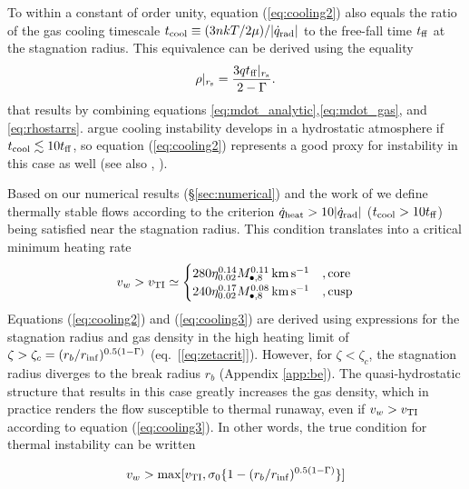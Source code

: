 \documentclass[usenatbib,fleqn]{mn2e}
\newcommand{\tff}{t_{\rm ff}}
\begin{document}
To within a constant of order unity, equation (\ref{eq:cooling2}) also
equals the ratio of the gas cooling timescale $t_{\rm cool} \equiv (3n
kT/2 \mu)/|\dot{q}_{\rm rad}|$ to the free-fall time $t_{\rm ff}$ at the
stagnation radius.  This equivalence can be derived using the equality
\begin{align}
\rho|_{r_{\rm s}}=\frac{3 q\tff|_{r_{\rm s}}}{2-\Gamma}.
\label{eq:rhors2}
\end{align}
that results by combining equations
\eqref{eq:mdot_analytic},\eqref{eq:mdot_gas}, and
\eqref{eq:rhostarrs}.  \citet{McCourt+12} argue cooling instability
develops in a hydrostatic atmosphere if $t_{\rm cool} \lesssim 10 t_{\rm ff}$,
so equation (\ref{eq:cooling2}) represents a good proxy for
instability in this case as well (see also \citealt{Li&Bryan14a}, \citealt{Li&Bryan14b}).

Based on our numerical results (\S \ref{sec:numerical}) and the work of \citet{McCourt+12} we define thermally stable flows according to the criterion $\dot{q}_{\rm heat} > 10|\dot{q}_{\rm rad}|$ ($t_{\rm
  cool} > 10t_{\rm ff}$) being satisfied near the stagnation radius.  This condition translates into a
critical minimum heating rate
\begin{align}
v_{w} > v_{\rm TI} \simeq
  \begin{cases}
   280 \eta_{0.02}^{0.14} M_{\bullet,8}^{0.11}\,{\rm km\,s^{-1}}  &, \text{core}\\
   240 \eta_{0.02}^{0.17} M_{\bullet,8}^{0.08}\,{\rm km\,s^{-1}}   &, \text{cusp}  \\
  \end{cases}
  \label{eq:cooling3}
\end{align}
Equations (\ref{eq:cooling2}) and (\ref{eq:cooling3}) are derived
using expressions for the stagnation radius and gas density in the
high heating limit of $\zeta > \zeta_c = (r_{b}/r_{\rm
  inf})^{0.5(1-\Gamma)}$ (eq.~[\ref{eq:zetacrit}]).  However, for
$\zeta < \zeta_c$, the stagnation radius diverges to the break radius
$r_b$ (Appendix \ref{app:be}).  The quasi-hydrostatic structure that
results in this case greatly increases the gas density, which in
practice renders the flow susceptible to thermal runaway, even if
$v_{w} > v_{\rm TI}$ according to equation (\ref{eq:cooling3}).  In
other words, the true condition for thermal instability  can be
written

\begin{equation}
v_w > {\rm max}[v_{\rm TI},\sigma_0\{1-(r_{b}/r_{\rm
  inf})^{0.5(1-\Gamma)}\}]
\label{eq:cooling4}
\end{equation}
\end{document}
